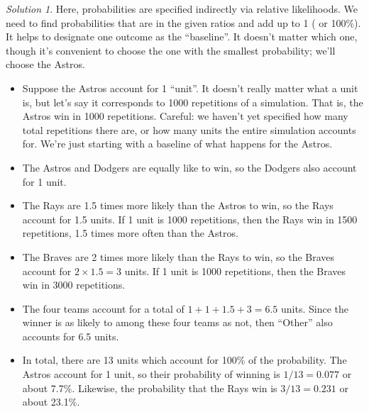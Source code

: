 \documentclass[
  letterpaper,
  DIV=11,
  numbers=noendperiod]{scrreprt}
\providecommand{\tightlist}{%
  \setlength{\itemsep}{0pt}\setlength{\parskip}{0pt}}
\theoremstyle{plain}
\theoremstyle{definition}
\theoremstyle{definition}
\theoremstyle{definition}
\theoremstyle{remark}
\newtheorem{refsolution}{Solution}[chapter]
\begin{document}
\begin{tcolorbox}[enhanced jigsaw, opacityback=0, rightrule=.15mm, coltitle=black, colframe=quarto-callout-tip-color-frame, toprule=.15mm, colbacktitle=quarto-callout-tip-color!10!white, opacitybacktitle=0.6, left=2mm, toptitle=1mm, breakable, title={Solution (click to expand)}, bottomtitle=1mm, colback=white, leftrule=.75mm, titlerule=0mm, arc=.35mm, bottomrule=.15mm]

\begin{refsolution}
Here, probabilities are specified indirectly via relative likelihoods.
We need to find probabilities that are in the given ratios and add up to
1 ( or 100\%). It helps to designate one outcome as the ``baseline''. It
doesn't matter which one, though it's convenient to choose the one with
the smallest probability; we'll choose the Astros.

\begin{itemize}
\tightlist
\item
  Suppose the Astros account for 1 ``unit''. It doesn't really matter
  what a unit\footnotemark{} is, but let's say it corresponds to 1000
  repetitions of a simulation. That is, the Astros win in 1000
  repetitions. Careful: we haven't yet specified how many total
  repetitions there are, or how many units the entire simulation
  accounts for. We're just starting with a baseline of what happens for
  the Astros.
\item
  The Astros and Dodgers are equally like to win, so the Dodgers also
  account for 1 unit.
\item
  The Rays are 1.5 times more likely than the Astros to win, so the Rays
  account for 1.5 units. If 1 unit is 1000 repetitions, then the Rays
  win in 1500 repetitions, 1.5 times more often than the Astros.
\item
  The Braves are 2 times more likely than the Rays to win, so the Braves
  account for \(2\times 1.5=3\) units. If 1 unit is 1000 repetitions,
  then the Braves win in 3000 repetitions.
\item
  The four teams account for a total of \(1+1+1.5+3 = 6.5\) units. Since
  the winner is as likely to among these four teams as not, then
  ``Other'' also accounts for 6.5 units.
\item
  In total, there are 13 units which account for 100\% of the
  probability. The Astros account for 1 unit, so their probability of
  winning is \(1/13=0.077\) or about 7.7\%. Likewise, the probability
  that the Rays win is \(3/13=0.231\) or about 23.1\%.
\end{itemize}


\end{refsolution}
\end{tcolorbox}
\end{document}
